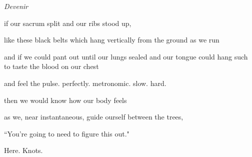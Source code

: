 \documentclass[11pt]{article}
\begin{document}
\begingroup
\begin{center}
\huge \textit{Devenir}
\end{center}
\endgroup

\vspace*{2\baselineskip}

\begingroup
\begin{center}
if our sacrum split and our ribs stood up,
\rightskip\leftskip
\end{center}
\endgroup

\begingroup
\begin{center}
like these black belts which hang vertically from the ground as we run
\rightskip\leftskip
\end{center}
\endgroup

\begingroup
\begin{center}
and if we could pant out until our lungs sealed and our tongue could hang such to taste the blood on our chest
\rightskip\leftskip
\end{center}
\endgroup

\begingroup
\begin{center}
and feel the pulse. perfectly. metronomic. slow. hard.
\rightskip\leftskip
\end{center}
\endgroup

\begingroup
\begin{center}
then we would know how our body feels
\rightskip\leftskip
\end{center}
\endgroup

\begingroup
\begin{center}
as we, near instantaneous, guide ourself between the trees,
\rightskip\leftskip
\end{center}
\endgroup

\vspace*{2\baselineskip}

\begingroup
\begin{center}
``You're going to need to figure this out."
\end{center}
\endgroup

\vspace*{4\baselineskip}

\begingroup
\begin{center}
Here. Knots.
\rightskip\leftskip
\end{center}
\endgroup

\vspace*{4\baselineskip}
\end{document}
